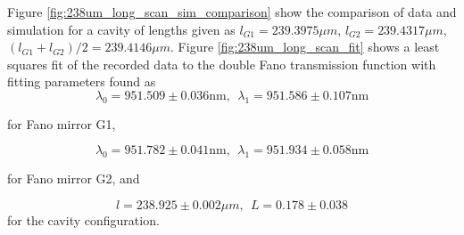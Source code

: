 Figure \ref{fig:238um_long_scan_sim_comparison} show the comparison of data and simulation for a cavity of lengths given as $l_{G1} = 239.3975 \mu m$, $l_{G2} = 239.4317 \mu m$, $(l_{G1} + l_{G2})/2 = 239.4146 \mu m$. Figure \ref{fig:238um_long_scan_fit} shows a least squares fit of the recorded data to the double Fano transmission function with fitting parameters found as 
\begin{equation}
    \lambda_0 = 951.509 \pm 0.036 \text{nm}, \:\: \lambda_1 = 951.586 \pm 0.107 \text{nm}
\end{equation}

for Fano mirror G1,

\begin{equation}
    \lambda_0 = 951.782 \pm 0.041 \text{nm}, \:\: \lambda_1 = 951.934 \pm 0.058 \text{nm}
\end{equation}

for Fano mirror G2, and

\begin{equation}
    l = 238.925 \pm 0.002 \mu m, \:\: L = 0.178 \pm 0.038
\end{equation}
for the cavity configuration.

